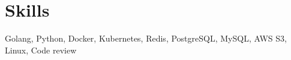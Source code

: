 \section{Skills}
Golang, Python, Docker, Kubernetes, Redis, PostgreSQL, MySQL, AWS S3, Linux, Code review
